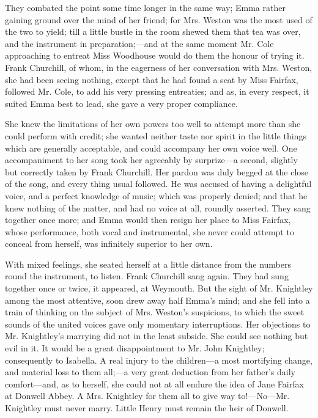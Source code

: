 


They combated the point some time longer in the same way; Emma rather gaining ground over the mind of her friend; for Mrs. Weston was the most used of the two to yield; till a little bustle in the room shewed them that tea was over, and the instrument in preparation;---and at the same moment Mr. Cole approaching to entreat Miss Woodhouse would do them the honour of trying it. Frank Churchill, of whom, in the eagerness of her conversation with Mrs. Weston, she had been seeing nothing, except that he had found a seat by Miss Fairfax, followed Mr. Cole, to add his very pressing entreaties; and as, in every respect, it suited Emma best to lead, she gave a very proper compliance.

She knew the limitations of her own powers too well to attempt more than she could perform with credit; she wanted neither taste nor spirit in the little things which are generally acceptable, and could accompany her own voice well. One accompaniment to her song took her agreeably by surprize---a second, slightly but correctly taken by Frank Churchill. Her pardon was duly begged at the close of the song, and every thing usual followed. He was accused of having a delightful voice, and a perfect knowledge of music; which was properly denied; and that he knew nothing of the matter, and had no voice at all, roundly asserted. They sang together once more; and Emma would then resign her place to Miss Fairfax, whose performance, both vocal and instrumental, she never could attempt to conceal from herself, was infinitely superior to her own.

With mixed feelings, she seated herself at a little distance from the numbers round the instrument, to listen. Frank Churchill sang again. They had sung together once or twice, it appeared, at Weymouth. But the sight of Mr. Knightley among the most attentive, soon drew away half Emma's mind; and she fell into a train of thinking on the subject of Mrs. Weston's suspicions, to which the sweet sounds of the united voices gave only momentary interruptions. Her objections to Mr. Knightley's marrying did not in the least subside. She could see nothing but evil in it. It would be a great disappointment to Mr. John Knightley; consequently to Isabella. A real injury to the children---a most mortifying change, and material loss to them all;---a very great deduction from her father's daily comfort---and, as to herself, she could not at all endure the idea of Jane Fairfax at Donwell Abbey. A Mrs. Knightley for them all to give way to!---No---Mr. Knightley must never marry. Little Henry must remain the heir of Donwell.

